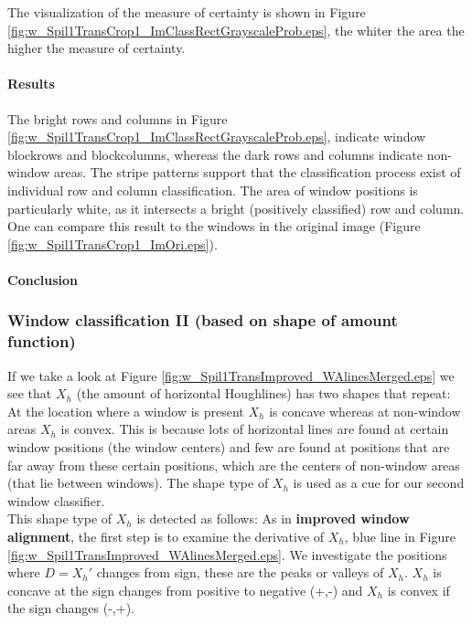 The visualization of the measure of certainty is shown in Figure
\ref{fig:w_Spil1TransCrop1_ImClassRectGrayscaleProb.eps},  
the whiter the area the higher the measure of certainty.

\paragraph{Results} %
\newpage

The bright rows and columns in Figure
\ref{fig:w_Spil1TransCrop1_ImClassRectGrayscaleProb.eps},  indicate window
blockrows and blockcolumns, whereas the dark rows and columns indicate
non-window areas.
The stripe patterns support that the classification process exist of individual
row and column classification.
The area of window positions is particularly white, as it 
intersects a bright (positively classified) row and column.
One can compare this result to the windows in the original image 
(Figure \ref{fig:w_Spil1TransCrop1_ImOri.eps}).


\paragraph{Conclusion}
\TODO{}


\subsubsection{Window classification II (based on shape of amount function)}
If we take a look at Figure \ref{fig:w_Spil1TransImproved_WAlinesMerged.eps}
we see that $X_h$ (the amount of horizontal Houghlines) has two shapes that
repeat:  At the location where a window is present $X_h$ is concave whereas at
non-window areas $X_h$ is convex. This is because lots of
horizontal lines are found at certain window positions (the window centers) and few
are found at positions that are far away from these certain positions, which are the
centers of non-window areas (that lie between windows).  The shape type of $X_h$ is
used as a cue for our second window classifier.\\

This shape type of $X_h$ is detected as follows:
As in \textbf{improved window alignment}, the first step is to examine the derivative of $X_h$, blue line in Figure \ref{fig:w_Spil1TransImproved_WAlinesMerged.eps}.
We investigate the positions where $D=X_{h}'$ changes from sign, these are the peaks or valleys of $X_h$. $X_h$ is concave at the sign changes from positive to negative (+,-) and $X_h$ is convex if the sign changes (-,+).\\

